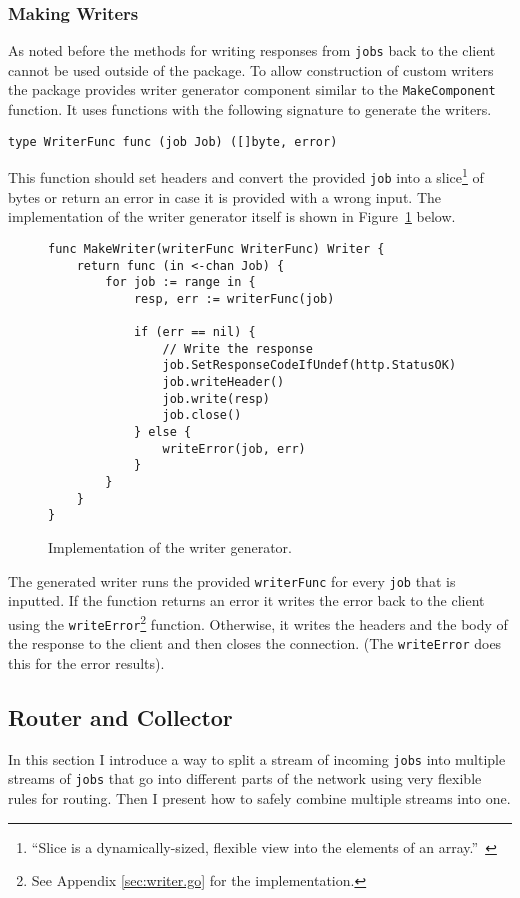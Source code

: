 \subsubsection{Making Writers}
As noted before the methods for writing responses from \texttt{jobs}
back to the client cannot be used outside of the package. To allow
construction of custom writers the package provides writer generator
component similar to the \texttt{MakeComponent} function. It uses 
functions with the following signature to generate the writers.
\begin{lstlisting}
type WriterFunc func (job Job) ([]byte, error)
\end{lstlisting}
This function should set headers and convert the provided \texttt{job} into 
a slice\footnote{``Slice is a dynamically-sized, flexible view into the elements 
of an array.''~\cite{tour}} of bytes or return an error in case it 
is provided with a 
wrong input. The implementation of the writer generator itself is shown
in Figure~\ref{fig:MakeWriter} below.
\begin{figure}[h]
\centering
\begin{lstlisting}
func MakeWriter(writerFunc WriterFunc) Writer {
    return func (in <-chan Job) {
        for job := range in {
            resp, err := writerFunc(job)

            if (err == nil) {
                // Write the response
                job.SetResponseCodeIfUndef(http.StatusOK)
                job.writeHeader()
                job.write(resp)
                job.close()
            } else {
                writeError(job, err)
            }
        }       
    }
}
\end{lstlisting}
\caption[scale=1.0]{Implementation of the writer generator.}
\label{fig:MakeWriter}
\end{figure}

The generated writer runs the provided \texttt{writerFunc} for every \texttt{job} 
that is inputted. If the function returns an error it writes the error 
back to the client using the \texttt{writeError}\footnote{See Appendix 
\ref{sec:writer.go} for the implementation.} function. Otherwise, it 
writes the headers and the body of the response to the client and then 
closes the connection. (The \texttt{writeError} does this for the error
results).

\subsection{Router and Collector}
In this section I introduce a way to split a stream of incoming \texttt{jobs} into
multiple streams of \texttt{jobs} that go into different parts of the network
using very flexible rules for routing. Then I present how to
safely combine multiple streams into one.

